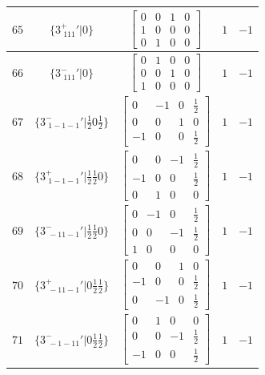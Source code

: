\documentclass[fleqn,8pt]{jsarticle}
\begin{document}
\begin{longtable}{ccccc}
$ 65 $ & $ \{3^{+}_{\,\,111}{}'|0\} $ & $ \begin{bmatrix} 0 & 0 & 1 & 0 \\ 1 & 0 & 0 & 0 \\ 0 & 1 & 0 & 0 \end{bmatrix} $ & $ 1 $ & $ -1 $ \\ \hline
$ 66 $ & $ \{3^{-}_{\,\,111}{}'|0\} $ & $ \begin{bmatrix} 0 & 1 & 0 & 0 \\ 0 & 0 & 1 & 0 \\ 1 & 0 & 0 & 0 \end{bmatrix} $ & $ 1 $ & $ -1 $ \\ \hline
$ 67 $ & $ \{3^{-}_{\,\,1-1-1}{}'|\frac{1}{2} 0 \frac{1}{2}\} $ & $ \begin{bmatrix} 0 & -1 & 0 & \frac{1}{2} \\ 0 & 0 & 1 & 0 \\ -1 & 0 & 0 & \frac{1}{2} \end{bmatrix} $ & $ 1 $ & $ -1 $ \\ \hline
$ 68 $ & $ \{3^{+}_{\,\,1-1-1}{}'|\frac{1}{2} \frac{1}{2} 0\} $ & $ \begin{bmatrix} 0 & 0 & -1 & \frac{1}{2} \\ -1 & 0 & 0 & \frac{1}{2} \\ 0 & 1 & 0 & 0 \end{bmatrix} $ & $ 1 $ & $ -1 $ \\ \hline
$ 69 $ & $ \{3^{-}_{\,\,-11-1}{}'|\frac{1}{2} \frac{1}{2} 0\} $ & $ \begin{bmatrix} 0 & -1 & 0 & \frac{1}{2} \\ 0 & 0 & -1 & \frac{1}{2} \\ 1 & 0 & 0 & 0 \end{bmatrix} $ & $ 1 $ & $ -1 $ \\ \hline
$ 70 $ & $ \{3^{+}_{\,\,-11-1}{}'|0 \frac{1}{2} \frac{1}{2}\} $ & $ \begin{bmatrix} 0 & 0 & 1 & 0 \\ -1 & 0 & 0 & \frac{1}{2} \\ 0 & -1 & 0 & \frac{1}{2} \end{bmatrix} $ & $ 1 $ & $ -1 $ \\ \hline
$ 71 $ & $ \{3^{-}_{\,\,-1-11}{}'|0 \frac{1}{2} \frac{1}{2}\} $ & $ \begin{bmatrix} 0 & 1 & 0 & 0 \\ 0 & 0 & -1 & \frac{1}{2} \\ -1 & 0 & 0 & \frac{1}{2} \end{bmatrix} $ & $ 1 $ & $ -1 $ \\ \hline

\end{longtable}
\end{document}
